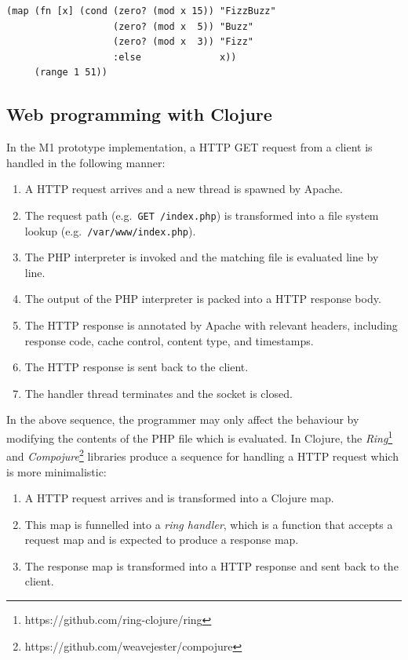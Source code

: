 \lstset{language=clojure}
\begin{lstlisting}[label=lst:fizzbuzz-functional,caption={
      [A functional implementation of Fizz buzz in Clojure]
       A functional implementation of Fizz buzz in Clojure.}]
(map (fn [x] (cond (zero? (mod x 15)) "FizzBuzz"
                   (zero? (mod x  5)) "Buzz"
                   (zero? (mod x  3)) "Fizz"
                   :else              x))
     (range 1 51))
\end{lstlisting}

\subsection{Web programming with Clojure}\label{subsec:functional-web}

In the M1 prototype implementation, a HTTP GET request from a client
is handled in the following manner:

\begin{enumerate}
\item A HTTP request arrives and a new thread is spawned by Apache.
\item The request path (e.g.\ \texttt{GET /index.php}) is transformed into
  a file system lookup (e.g.\ \texttt{/var/www/index.php}).
\item The PHP interpreter is invoked and the matching file is
  evaluated line by line.
\item The output of the PHP interpreter is packed into a HTTP response
  body.
\item The HTTP response is annotated by Apache with relevant headers,
  including response code, cache control, content type, and
  timestamps.
\item The HTTP response is sent back to the client.
\item The handler thread terminates and the socket is closed.
\end{enumerate}

In the above sequence, the programmer may only affect the behaviour by
modifying the contents of the PHP file which is evaluated. In Clojure,
the \textit{Ring}\footnote{https://github.com/ring-clojure/ring} and
\textit{Compojure}\footnote{https://github.com/weavejester/compojure}
libraries produce a sequence for handling a HTTP request which is more
minimalistic:

\begin{enumerate}
\item A HTTP request arrives and is transformed into a Clojure map.
\item This map is funnelled into a \textit{ring handler}, which is a
  function that accepts a request map and is expected to produce a
  response map.
\item The response map is transformed into a HTTP response and sent
  back to the client.
\end{enumerate}

